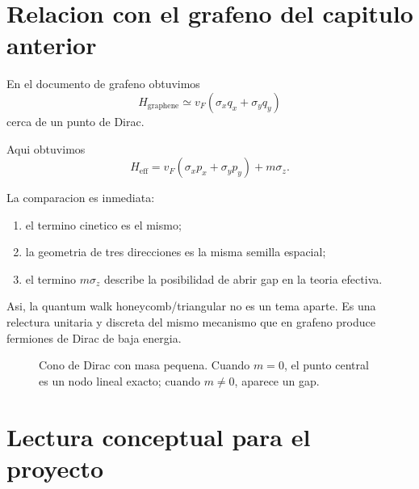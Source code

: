 \section{Relacion con el grafeno del capitulo anterior}

En el documento de grafeno obtuvimos
\begin{equation}
H_{\text{graphene}} \simeq v_F(\sigma_x q_x + \sigma_y q_y)
\end{equation}
cerca de un punto de Dirac.

Aqui obtuvimos
\begin{equation}
H_{\text{eff}}
=
v_F(\sigma_x p_x + \sigma_y p_y)+m\sigma_z.
\end{equation}

La comparacion es inmediata:

\begin{enumerate}[leftmargin=*]
  \item el termino cinetico es el mismo;
  \item la geometria de tres direcciones es la misma semilla espacial;
  \item el termino \(m\sigma_z\) describe la posibilidad de abrir gap en la teoria efectiva.
\end{enumerate}

Asi, la quantum walk honeycomb/triangular no es un tema aparte. Es una relectura unitaria y discreta del mismo mecanismo que en grafeno produce fermiones de Dirac de baja energia.

\begin{figure}[ht]
\centering
{}
\caption{Cono de Dirac con masa pequena. Cuando \(m=0\), el punto central es un nodo lineal exacto; cuando \(m\neq 0\), aparece un gap.}
\label{c03:fig:diraccone}
\end{figure}

\section{Lectura conceptual para el proyecto}

